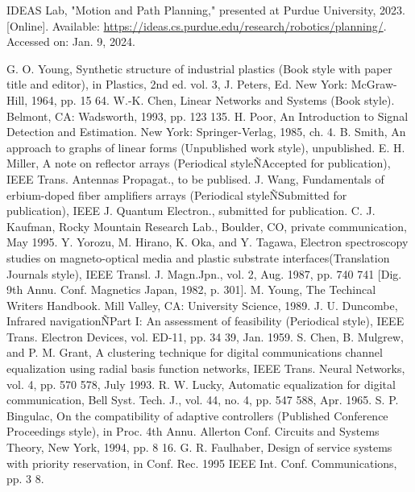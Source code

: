 \documentclass[letterpaper, 10 pt, conference]{ieeeconf}  %
\begin{document}
\begin{thebibliography}{99}
	
	IDEAS Lab, "Motion and Path Planning," presented at Purdue University, 2023. [Online]. Available: \url{https://ideas.cs.purdue.edu/research/robotics/planning/}. Accessed on: Jan. 9, 2024.
	

 G. O. Young,  Synthetic structure of industrial plastics (Book style with paper title and editor),  	in Plastics, 2nd ed. vol. 3, J. Peters, Ed.  New York: McGraw-Hill, 1964, pp. 15 64.
 W.-K. Chen, Linear Networks and Systems (Book style).	Belmont, CA: Wadsworth, 1993, pp. 123 135.
 H. Poor, An Introduction to Signal Detection and Estimation.   New York: Springer-Verlag, 1985, ch. 4.
 B. Smith,  An approach to graphs of linear forms (Unpublished work style),  unpublished.
 E. H. Miller,  A note on reflector arrays (Periodical styleÑAccepted for publication),  IEEE Trans. Antennas Propagat., to be publised.
 J. Wang,  Fundamentals of erbium-doped fiber amplifiers arrays (Periodical styleÑSubmitted for publication),  IEEE J. Quantum Electron., submitted for publication.
 C. J. Kaufman, Rocky Mountain Research Lab., Boulder, CO, private communication, May 1995.
 Y. Yorozu, M. Hirano, K. Oka, and Y. Tagawa,  Electron spectroscopy studies on magneto-optical media and plastic substrate interfaces(Translation Journals style),  IEEE Transl. J. Magn.Jpn., vol. 2, Aug. 1987, pp. 740 741 [Dig. 9th Annu. Conf. Magnetics Japan, 1982, p. 301].
 M. Young, The Techincal Writers Handbook.  Mill Valley, CA: University Science, 1989.
 J. U. Duncombe,  Infrared navigationÑPart I: An assessment of feasibility (Periodical style),  IEEE Trans. Electron Devices, vol. ED-11, pp. 34 39, Jan. 1959.
 S. Chen, B. Mulgrew, and P. M. Grant,  A clustering technique for digital communications channel equalization using radial basis function networks,  IEEE Trans. Neural Networks, vol. 4, pp. 570 578, July 1993.
 R. W. Lucky,  Automatic equalization for digital communication,  Bell Syst. Tech. J., vol. 44, no. 4, pp. 547 588, Apr. 1965.
 S. P. Bingulac,  On the compatibility of adaptive controllers (Published Conference Proceedings style),  in Proc. 4th Annu. Allerton Conf. Circuits and Systems Theory, New York, 1994, pp. 8 16.
 G. R. Faulhaber,  Design of service systems with priority reservation,  in Conf. Rec. 1995 IEEE Int. Conf. Communications, pp. 3 8.

\end{thebibliography}
\end{document}
